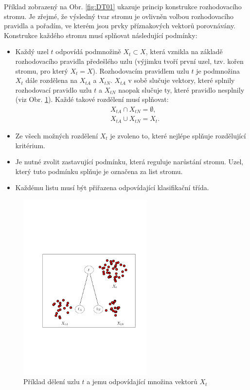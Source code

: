 \par{Příklad zobrazený na Obr. \ref{fig:DT01} ukazuje princip konstrukce rozhodovacího stromu. Je zřejmé, že výsledný tvar stromu je ovlivněn volbou  rozhodovacího pravidla a pořadím, ve kterém jsou prvky příznakových vektorů porovnávány. Konstrukce každého stromu musí splňovat následující podmínky:
\begin{itemize}
	\item Každý uzel $t$ odpovídá podmnožině $X_t\subset X$, která vznikla na základě rozhodovacího pravidla předešlého uzlu (výjimku tvoří první uzel, tzv. kořen stromu, pro který $X_t=X$). Rozhodovacím pravidlem uzlu $t$ je podmnožina $X_t$ dále rozdělena na $X_{tA}$ a $X_{tN}$. $X_{tA}$ v sobě slučuje vektory, které splnily rozhodovací pravidlo uzlu $t$ a $X_{tN}$ naopak slučuje ty, které pravidlo nesplnily (viz Obr. \ref{fig:DT02}). Každé takové rozdělení musí splňovat:
	\begin{eqnarray}
		\nonumber
		& X_{tA} \cap X_{tN} = \emptyset,\\
		\nonumber
		& X_{tA} \cup X_{tN} = X_t.
	\end{eqnarray}

	\item Ze všech možných rozdělení $X_t$ je zvoleno to, které nejlépe splňuje rozdělující kritérium.
	\item Je nutné zvolit zastavující podmínku, která reguluje narůstání stromu. Uzel, který tuto podmínku splňuje je označena za list stromu.
	\item Každému listu musí být přiřazena odpovídající klasifikační třída.
\end{itemize}
\begin{figure}[!ht]
	\centering
	\includegraphics[width = 0.6\textwidth, trim = 3cm 7.5cm 2cm 9cm]{./Img/Prednaska09/decisionTrees/DT02.pdf}
	\caption{Příklad dělení uzlu $t$ a jemu odpovídající množina vektorů $X_t$}
	\label{fig:DT02}
\end{figure}

}
